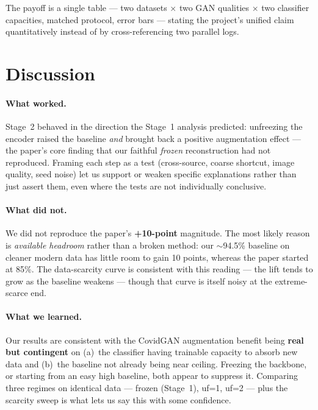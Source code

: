 \documentclass[11pt]{article}
\begin{document}
\noindent The payoff is a single table --- two datasets $\times$ two GAN qualities
$\times$ two classifier capacities, matched protocol, error bars --- stating the
project's unified claim quantitatively instead of by cross-referencing two parallel
logs.

\section{Discussion}
\label{sec:discussion}

\paragraph{What worked.} Stage~2 behaved in the direction the Stage~1 analysis
predicted: unfreezing the encoder raised the baseline \emph{and} brought back a
positive augmentation effect --- the paper's core finding that our faithful
\emph{frozen} reconstruction had not reproduced. Framing each step as a test
(cross-source, coarse shortcut, image quality, seed noise) let us support or weaken
specific explanations rather than just assert them, even where the tests are not
individually conclusive.

\paragraph{What did not.} We did not reproduce the paper's \textbf{+10-point}
magnitude. The most likely reason is \emph{available headroom} rather than a broken
method: our $\sim$94.5\% baseline on cleaner modern data has little room to gain 10
points, whereas the paper started at 85\%. The data-scarcity curve is consistent
with this reading --- the lift tends to grow as the baseline weakens --- though
that curve is itself noisy at the extreme-scarce end.

\paragraph{What we learned.} Our results are consistent with the CovidGAN
augmentation benefit being \textbf{real but contingent} on (a)~the classifier
having trainable capacity to absorb new data and (b)~the baseline not already being
near ceiling. Freezing the backbone, or starting from an easy high baseline, both
appear to suppress it. Comparing three regimes on identical data --- frozen
(Stage~1), uf=1, uf=2 --- plus the scarcity sweep is what lets us say this with
some confidence.
\end{document}
